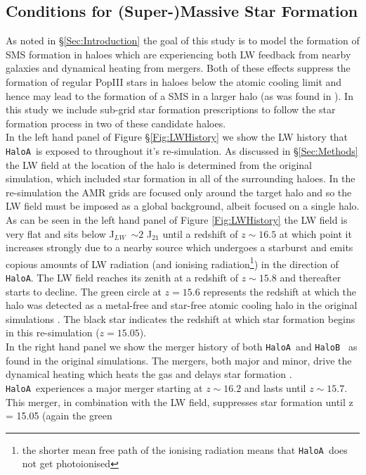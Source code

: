 \documentclass[graphics, twocolumn, usenatbib]{mn2e}
\newcommand{\JLW} {J$_{LW}$}
\newcommand{\ha} {\texttt{HaloA~}}
\newcommand{\hb} {\texttt{HaloB~}}
\newcommand{\hac} {\texttt{HaloA}}
\begin{document}
\subsection{Conditions for (Super-)Massive Star Formation}
As noted in \S \ref{Sec:Introduction} the goal of this study is to model the formation of SMS formation in haloes which are experiencing both LW feedback from nearby galaxies and dynamical heating from mergers. Both of these effects suppress the formation of regular PopIII stars in haloes
below the atomic cooling limit and hence may lead to the formation of a SMS in a larger halo (as was found in \cite{Wise_2019}). In this study we include 
sub-grid star formation prescriptions to follow the star formation process in 
two of these candidate haloes.\\
\indent In the left hand panel of Figure \S \ref{Fig:LWHistory} we show the LW history that \ha is
exposed to throughout it's re-simulation. As discussed in \S \ref{Sec:Methods} the LW field at the
location of the halo is determined from the original simulation, which included star formation
in all of the surrounding haloes. In the re-simulation the AMR grids are focused only around the
target halo and so the LW field must be imposed as a global background, albeit focused on a single
halo. As can be seen in the left hand panel of Figure \ref{Fig:LWHistory} the LW field is very flat and sits below \JLW \ $\sim 2$
J$_{21}$ until a redshift of $z \sim 16.5$ at which point it increases strongly due to a nearby source
which undergoes a starburst and emits copious amounts of LW radiation
(and ionising radiation\footnote{the
  shorter mean free path of the ionising radiation means that \ha does not get photoionised}) in the
direction of \hac. The LW field reaches its zenith at a redshift of $z \sim 15.8$ and thereafter
starts to decline. The green circle at $z = 15.6$ represents the redshift at which the halo was
detected as a metal-free and star-free atomic cooling halo in the original simulations
\citep[see][for details]{Regan_2020}. The black star indicates the redshift at which star formation begins in this
re-simulation ($z = 15.05$). \\
\indent In the right hand panel we show the merger history of both \ha and \hb
as found in the original simulations. The mergers, both major and minor, drive the dynamical heating
which heats the gas and delays star formation \citep{Wise_2019}. 
\ha experiences a major merger starting at $z \sim 16.2$ and lasts until $z \sim 15.7$. This
merger, in combination with the LW field, suppresses star formation until z = 15.05 (again the green
\end{document}
